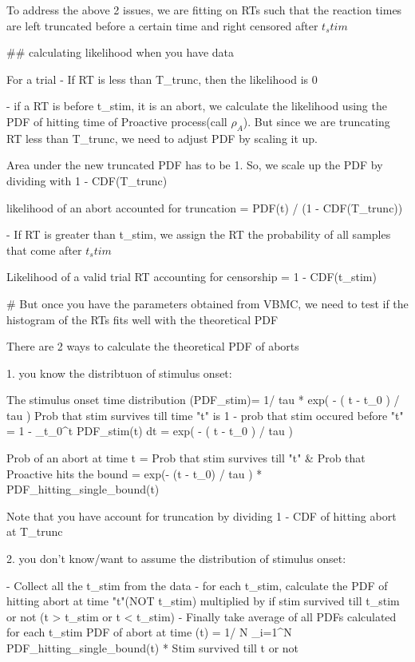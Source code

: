 
To address the above 2 issues, we are fitting on RTs such that the reaction times are left truncated before a certain time
 and right censored after $t_stim$


## calculating likelihood when you have data

For a trial
- If RT is less than T_trunc, then the likelihood is 0

- if a RT is before t_stim, it is an abort, we calculate the likelihood using the PDF of hitting time of Proactive process(call $\rho_A$).
But since we are truncating RT less than T_trunc, we need to adjust PDF by scaling it up. 





Area under the new truncated PDF has to be 1. So, we scale up the PDF by dividing with 1 - CDF(T_trunc)

likelihood of an abort accounted for truncation = PDF(t) / (1 - CDF(T_trunc))


- If RT is greater than t_stim, we assign the RT the probability of all samples that come after $t_stim$

Likelihood of a valid trial RT accounting for censorship = 1 - CDF(t_stim)



# But once you have the parameters obtained from VBMC, we need to test if the histogram of the RTs fits well with the theoretical PDF

There are 2 ways to calculate the theoretical PDF of aborts

1. you know the distribtuon of stimulus onset:

The stimulus onset time distribution (PDF_stim)= 1/ tau * exp( - ( t - t_0 ) / tau )
Prob that stim survives till time "t" is 1 - prob that stim occured before "t"
 =  1 - \int_{t_0}^{t} PDF_stim(t) dt = exp( - ( t - t_0 ) / tau )


 Prob of an abort at time t = Prob that stim survives till "t" & Prob that Proactive hits the bound
                             = exp(- (t - t_0) / tau ) * PDF_hitting_single_bound(t)


Note that you have account for truncation by dividing 1 - CDF of hitting abort at T_trunc

2. you don't know/want to assume the distribution of stimulus onset:

- Collect all the t_stim from the data
- for each t_stim, calculate the PDF of hitting abort at time "t"(NOT t_stim) multiplied by if stim survived till t_stim or not (t > t_stim or t < t_stim)
- Finally take average of all PDFs calculated for each t_stim
PDF of abort at time (t) = 1/ N \Sigma_{i=1}^{N} PDF_hitting_single_bound(t) * Stim survived till t or not 


